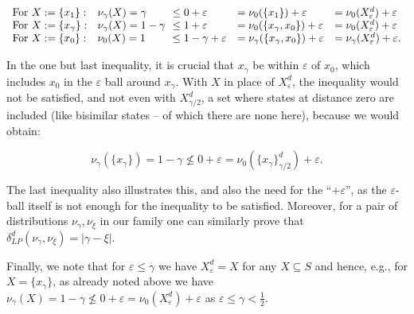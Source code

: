 \par  \quad  \[\begin{array}[]{lllll}\mbox{For }X:=\{x_{1}\}:&\nu_{\gamma}(X)=\gamma&\!\!\leq
0+\varepsilon&=\nu_{0}(\{x_{1}\})+\varepsilon&=\nu_{0}(X^{d}_{\varepsilon})+\varepsilon\\
\mbox{For }X:=\{x_{\gamma}\}:&\nu_{\gamma}(X)=1-\gamma&\!\!\leq 1+\varepsilon&=\nu_{0}(\{x_{\gamma},x_{0}\})+\varepsilon&=\nu_{0}(X^{d}_{\varepsilon})+\varepsilon\\
\mbox{For }X:=\{x_{0}\}:&\nu_{0}(X)=1&\!\!\leq 1-\gamma+\varepsilon&=\nu_{\gamma}(\{x_{\gamma},x_{0}\})+\varepsilon&=\nu_{\gamma}(X^{d}_{\varepsilon})+\varepsilon.\end{array}\]\quad  \quad  
  
In the one but last inequality, it is crucial that $x_{\gamma}$ be within $\varepsilon$ of $x_{0}$, which includes $x_{0}$ in the $\varepsilon$ ball around $x_{\gamma}$. With $X$ in place of $X^{d}_{\varepsilon}$, the inequality would not be satisfied, and not even with $X^{d}_{\gamma/2}$, a set where states at distance zero are included (like bisimilar states – of which there are none here), because we would obtain:\par
  
\par  \quad  \[\nu_{\gamma}(\{x_{\gamma}\})=1-\gamma\not\leq 0+\varepsilon=\nu_{0}(\{x_{\gamma}\}^{d}_{\gamma/2})+\varepsilon.\]\quad  \quad  
  
The last inequality also illustrates this, and also the need for the “$+\varepsilon$”, as the $\varepsilon$-ball itself is not enough for the inequality to be satisfied. Moreover, for a pair of distributions $\nu_{\gamma},\nu_{\xi}$ in our family one can similarly prove that $\delta^{d}_{LP}(\nu_{\gamma},\nu_{\xi})=|\gamma-\xi|$.\par
 
 
 
Finally, we note that for $\varepsilon\leq\gamma$ we have $X_{\varepsilon}^{d}=X$ for any $X\subseteq S$ and hence, e.g., for $X=\{x_{\gamma}\}$, as already noted above we have $\nu_{\gamma}(X)=1-\gamma\not\leq 0+\varepsilon=\nu_{0}(X^{d}_{\varepsilon})+\varepsilon$ as $\varepsilon\leq\gamma<\frac{1}{2}$.\par
 
 
 
 

